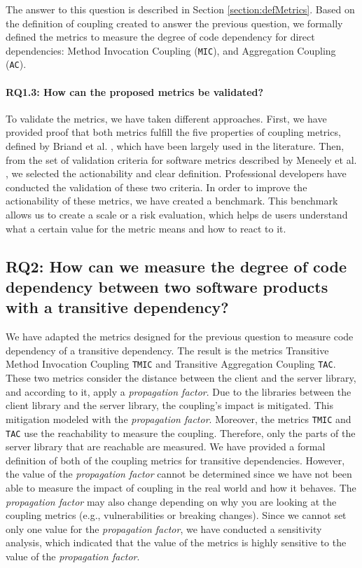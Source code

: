 The answer to this question is described in Section \ref{section:defMetrics}. Based on the definition of coupling created to answer the previous question, we formally defined the metrics to measure the degree of code dependency for direct dependencies: Method Invocation Coupling (\texttt{MIC}), and Aggregation Coupling (\texttt{AC}).

\paragraph{RQ1.3: How can the proposed metrics be validated?}

To validate the metrics, we have taken different approaches. First, we have provided proof that both metrics fulfill the five properties of coupling metrics, defined by Briand et al. \cite{briand1996property}, which have been largely used in the literature. Then, from the set of validation criteria for software metrics described by Meneely et al. \cite{Meneely2012}, we selected the actionability and clear definition. Professional developers have conducted the validation of these two criteria. In order to improve the actionability of these metrics, we have created a benchmark. This benchmark allows us to create a scale or a risk evaluation, which helps de users understand what a certain value for the metric means and how to react to it.

\subsection{RQ2: How can we measure the degree of code dependency between two software products with a transitive dependency?}

We have adapted the metrics designed for the previous question to measure code dependency of a transitive dependency. The result is the metrics Transitive Method Invocation Coupling \texttt{TMIC} and Transitive Aggregation Coupling \texttt{TAC}. These two metrics consider the distance between the client and the server library, and according to it, apply a \textit{propagation factor}. Due to the libraries between the client library and the server library, the coupling's impact is mitigated. This mitigation modeled with the \textit{propagation factor}. Moreover, the metrics \texttt{TMIC} and \texttt{TAC} use the reachability to measure the coupling. Therefore, only the parts of the server library that are reachable are measured. We have provided a formal definition of both of the coupling metrics for transitive dependencies. However, the value of the \textit{propagation factor} cannot be determined since we have not been able to measure the impact of coupling in the real world and how it behaves. The \textit{propagation factor} may also change depending on why you are looking at the coupling metrics (e.g., vulnerabilities or breaking changes). Since we cannot set only one value for the \textit{propagation factor}, we have conducted a sensitivity analysis, which indicated that the value of the metrics is highly sensitive to the value of the \textit{propagation factor}.

